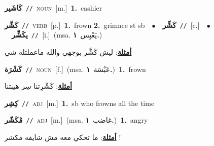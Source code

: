 \documentclass[10pt,a4paper,twoside]{article} %
\begin{document}
\begin{multicols}{2}
{\setlength\topsep{0pt}\textbf{\foreignlanguage{arabic}{كَاشَير}}\ {\color{gray}\texttt{//}\color{black}}\ \textsc{noun}\ [m.]\ \textbf{1.}~cashier\ } \vspace{2mm}

{\setlength\topsep{0pt}\textbf{\foreignlanguage{arabic}{كَشَّر}}\ {\color{gray}\texttt{//}\color{black}}\ \textsc{verb}\ [p.]\ \textbf{1.}~frown  \textbf{2.}~grimace st sb\ \ $\bullet$\ \ \setlength\topsep{0pt}\textbf{\foreignlanguage{arabic}{كَشِّر}}\ {\color{gray}\texttt{//}\color{black}}\ [c.]\ \ $\bullet$\ \ \setlength\topsep{0pt}\textbf{\foreignlanguage{arabic}{يكَشِّر}}\ {\color{gray}\texttt{//}\color{black}}\ [i.]\ \color{gray}(msa. \foreignlanguage{arabic}{يَعْبِس}~\foreignlanguage{arabic}{\textbf{١.}})\color{black}\  \begin{flushright}\color{gray}\foreignlanguage{arabic}{\textbf{\underline{\foreignlanguage{arabic}{أمثلة}}}: ليش كَشَّر بوجهي والله ماعملتله شي}\end{flushright}\color{black}} \vspace{2mm}

{\setlength\topsep{0pt}\textbf{\foreignlanguage{arabic}{كَشْرَة}}\ {\color{gray}\texttt{//}\color{black}}\ \textsc{noun}\ [f.]\ \color{gray}(msa. \foreignlanguage{arabic}{عَبْسَة}~\foreignlanguage{arabic}{\textbf{١.}})\color{black}\ \textbf{1.}~frown\  \begin{flushright}\color{gray}\foreignlanguage{arabic}{\textbf{\underline{\foreignlanguage{arabic}{أمثلة}}}: كَشْرِتنا سِر هيبتنا}\end{flushright}\color{black}} \vspace{2mm}

{\setlength\topsep{0pt}\textbf{\foreignlanguage{arabic}{كِشِر}}\ {\color{gray}\texttt{//}\color{black}}\ \textsc{adj}\ [m.]\ \textbf{1.}~sb who frowns all the time\ } \vspace{2mm}

{\setlength\topsep{0pt}\textbf{\foreignlanguage{arabic}{مْكَشّر}}\ {\color{gray}\texttt{//}\color{black}}\ \textsc{adj}\ [m.]\ \color{gray}(msa. \foreignlanguage{arabic}{غاضب}~\foreignlanguage{arabic}{\textbf{١.}})\color{black}\ \textbf{1.}~angry\  \begin{flushright}\color{gray}\foreignlanguage{arabic}{\textbf{\underline{\foreignlanguage{arabic}{أمثلة}}}: ما تحكي معه مش شايفه مكشر !}\end{flushright}\color{black}} \vspace{2mm}


\end{multicols}
\end{document}
